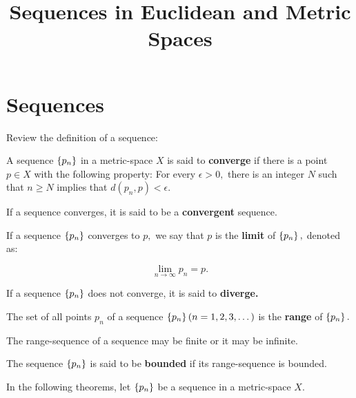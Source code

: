 \documentclass{article}
\title{Sequences in Euclidean and Metric Spaces}
\begin{document}
\section{Sequences}

Review the definition of a sequence:


\begin{definition}[Converge]
A sequence $\left\{ p_n \right\}$ in a \@{metric-space} $X$ is said to \textbf{converge} if there is a point $p \in X$ with the following property: For every $\epsilon > 0,$ there is an \@{integer} $N$ such that $n \geq N$ implies that $d(p_n, p) < \epsilon.$
\end{definition}

\begin{definition}[Convergent]
If a \@{sequence} \@{converges}, it is said to be a \textbf{convergent} \@{sequence}.
\end{definition}

\begin{definition}\label{limit-sequence}
If a \@{sequence} $\left\{ p_n \right\}$ converges to $p,$ we say that $p$ is the \textbf{limit} of $\left\{ p_n \right\},$ denoted as:

\[ \lim_{n \to \infty} p_n = p. \]
\end{definition}

\begin{definition}[Diverge]
If a \@{sequence} $\left\{ p_n \right\}$ does not \@{converge}, it is said to \textbf{diverge.}
\end{definition}

\begin{definition}
The set of all points $p_n$ of a \@{sequence} $\left\{ p_n \right\} (n = 1, 2, 3, \dots)$ is the \textbf{\@{range}} of $\left\{ p_n \right\}.$
\end{definition}

\begin{note}\label{sequence-range-cardinality}
The \@{range-sequence} of a \@{sequence} may be \@{finite} or it may be \@{infinite}.
\end{note}

\begin{definition}
The \@{sequence} $\left\{ p_n \right\}$ is said to be \textbf{bounded} if its \@{range-sequence} is \@{bounded}.
\end{definition}

\begin{note}\label{sequence-theorems-context}
In the following theorems, let $\left\{ p_n \right\}$ be a \@{sequence} in a \@{metric-space} $X.$
\end{note}
\end{document}
